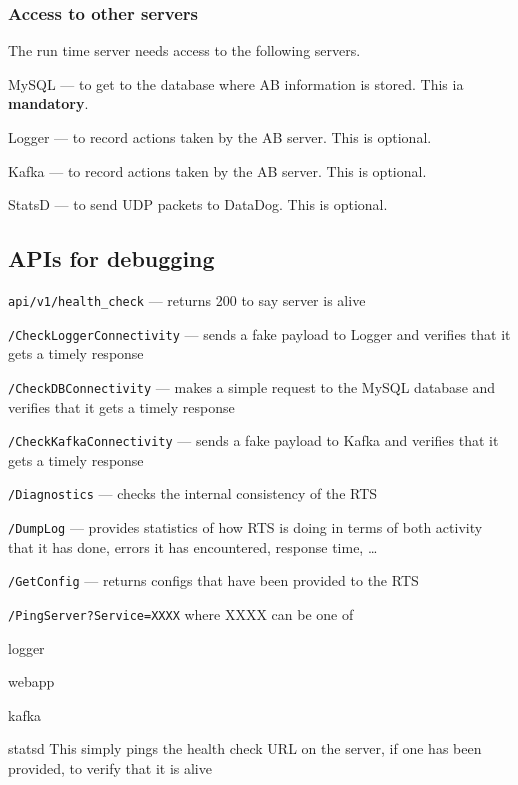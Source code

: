 \documentclass[letterpaper]{article}
\begin{document}
\subsubsection{Access to other servers}

The run time server needs access to the following servers. 
\be
\item MySQL --- to get to the database where AB information is stored. This ia
  {\bf mandatory}.
\item Logger --- to record actions taken by the AB server. This is optional.
\item Kafka --- to record actions taken by the AB server. This is optional.
\item StatsD --- to send UDP packets to DataDog. This is optional.
\ee

\subsection{APIs for debugging}

\be
\item {\tt api/v1/health\_check} --- returns 200 to say server is alive
\item {\tt /CheckLoggerConnectivity} --- sends a fake payload to Logger and
  verifies that it gets a timely response
\item {\tt /CheckDBConnectivity} --- makes a simple request to the MySQL
  database and verifies that it gets a timely response
\item {\tt /CheckKafkaConnectivity} --- sends a fake payload to Kafka and
  verifies that it gets a timely response
\item {\tt /Diagnostics} --- checks the internal consistency of the RTS
\item {\tt /DumpLog} --- provides statistics of how RTS is doing in terms of
  both activity that it has done, errors it has encountered, response time,
  \ldots
\item {\tt /GetConfig} --- returns configs that have been provided to the
  RTS
\item {\tt /PingServer?Service=XXXX} where XXXX can be one of 
  \be
\item logger
\item webapp
\item kafka 
\item statsd 
  \ee
  This simply pings the health check URL on the server, if one has been
  provided, to verify that it is alive
  \ee
\end{document}

